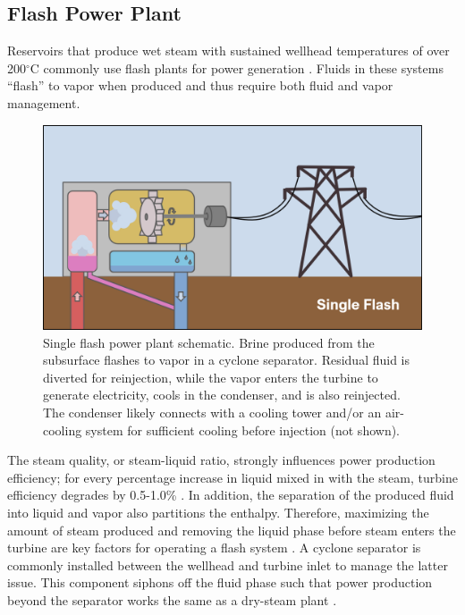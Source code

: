 \subsection{Flash Power Plant}\label{ch2:flash_plant}
Reservoirs that produce wet steam with sustained wellhead temperatures of over 200$^\circ$C commonly use flash plants for power generation \citep{moore_more_2013}. Fluids in these systems “flash” to vapor when produced and thus require both fluid and vapor management. 

\begin{figure}[!htp] %
\centering
\includegraphics[width=.9\textwidth]{templates/images/Figure-FlashPlant_Schematic.png}
\caption[Single flash power plant schematic]{Single flash power plant schematic. Brine produced from the subsurface flashes to vapor in a cyclone separator. Residual fluid is diverted for reinjection, while the vapor enters the turbine to generate electricity, cools in the condenser, and is also reinjected. The condenser likely connects with a cooling tower and/or an air-cooling system for sufficient cooling before injection (not shown).}
\label{fig:flash_plant}
\end{figure}

The steam quality, or steam-liquid ratio, strongly influences power production efficiency; for every percentage increase in liquid mixed in with the steam, turbine efficiency degrades by 0.5-1.0\% \citep[Baumann Rule,][p.\ 207]{glassley_geothermal_2015}. In addition, the separation of the produced fluid into liquid and vapor also partitions the enthalpy. Therefore, maximizing the amount of steam produced and removing the liquid phase before steam enters the turbine are key factors for operating a flash system \citep[p.\ 215-216]{glassley_geothermal_2015}. A cyclone separator is commonly installed between the wellhead and turbine inlet to manage the latter issue. This component siphons off the fluid phase such that power production beyond the separator works the same as a dry-steam plant \citep[p.\ 88]{dipippo_geothermal_2012}.

